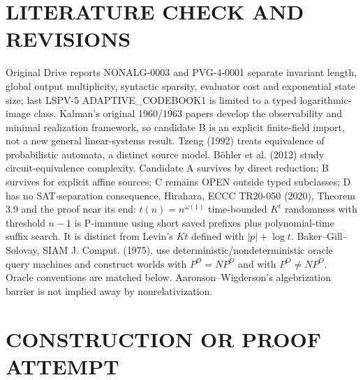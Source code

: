 \documentclass[11pt]{article}
\begin{document}
\section{LITERATURE CHECK AND REVISIONS}
Original Drive reports NONALG-0003 and PVG-4-0001 separate invariant length, global output multiplicity, syntactic sparsity, evaluator cost and exponential state size; last LSPV-5 ADAPTIVE\_CODEBOOK1 is limited to a typed logarithmic-image class. Kalman's original 1960/1963 papers develop the observability and minimal realization framework, so candidate B is an explicit finite-field import, not a new general linear-systems result. Tzeng (1992) treats equivalence of probabilistic automata, a distinct source model. B\"ohler et al. (2012) study circuit-equivalence complexity. Candidate A survives by direct reduction; B survives for explicit affine sources; C remains OPEN outside typed subclasses; D has no SAT-separation consequence.
Hirahara, ECCC TR20-050 (2020), Theorem 3.9 and the proof near its end: $t(n)=n^{\omega(1)}$ time-bounded $K^t$ randomness with threshold $n-1$ is P-immune using short saved prefixes plus polynomial-time suffix search. It is distinct from Levin's $Kt$ defined with $|p|+\log t$. Baker--Gill--Solovay, SIAM J. Comput. (1975), use deterministic/nondeterministic oracle query machines and construct worlds with $P^O=NP^O$ and with $P^O\ne NP^O$. Oracle conventions are matched below. Aaronson--Wigderson's algebrization barrier is not implied away by nonrelativization.

\section{CONSTRUCTION OR PROOF ATTEMPT}
\end{document}
